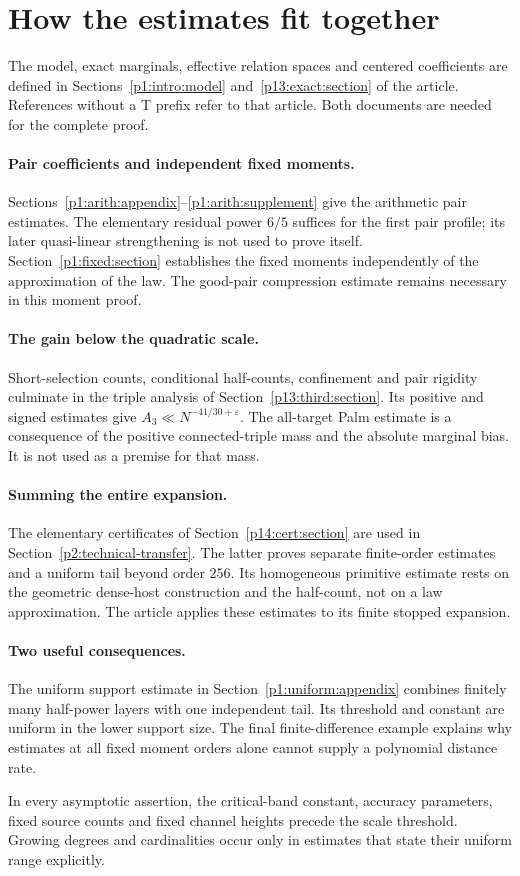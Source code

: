 \section*{How the estimates fit together}
The model, exact marginals, effective relation spaces and centered
coefficients are defined in Sections~\ref{p1:intro:model}
and~\ref{p13:exact:section} of the article. References without a
T prefix refer to that article. Both documents are needed for the
complete proof.

\paragraph{Pair coefficients and independent fixed moments.}
Sections~\ref{p1:arith:appendix}--\ref{p1:arith:supplement}
give the arithmetic pair estimates. The elementary residual power
$6/5$ suffices for the first pair profile; its later quasi-linear
strengthening is not used to prove itself. Section~\ref{p1:fixed:section}
establishes the fixed moments independently of the approximation of
the law. The good-pair compression estimate remains necessary in this
moment proof.

\paragraph{The gain below the quadratic scale.}
Short-selection counts, conditional half-counts, confinement and
pair rigidity culminate in the triple analysis of
Section~\ref{p13:third:section}. Its positive and signed estimates
give $A_3\ll N^{-41/30+\varepsilon}$. The all-target Palm estimate
is a consequence of the positive connected-triple mass and the
absolute marginal bias. It is not used as a premise for that mass.

\paragraph{Summing the entire expansion.}
The elementary certificates of Section~\ref{p14:cert:section}
are used in Section~\ref{p2:technical-transfer}. The latter proves
separate finite-order estimates and a uniform tail beyond order
$256$. Its homogeneous primitive estimate rests on the geometric
dense-host construction and the half-count, not on a law approximation.
The article applies these estimates to its finite stopped expansion.

\paragraph{Two useful consequences.}
The uniform support estimate in Section~\ref{p1:uniform:appendix}
combines finitely many half-power layers with one independent tail.
Its threshold and constant are uniform in the lower support size.
The final finite-difference example explains why estimates at all
fixed moment orders alone cannot supply a polynomial distance rate.

In every asymptotic assertion, the critical-band constant, accuracy
parameters, fixed source counts and fixed channel heights precede
the scale threshold. Growing degrees and cardinalities occur only
in estimates that state their uniform range explicitly.
